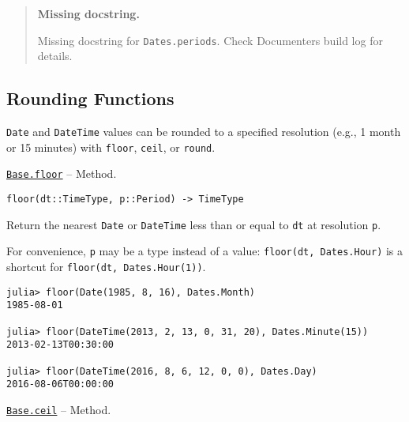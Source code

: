 \begin{quote}
\textbf{Missing docstring.}

Missing docstring for \texttt{Dates.periods}. Check Documenter{\textquotesingle}s build log for details.

\end{quote}


\hypertarget{17803150666173094488}{}


\subsection{Rounding Functions}



\texttt{Date} and \texttt{DateTime} values can be rounded to a specified resolution (e.g., 1 month or 15 minutes) with \texttt{floor}, \texttt{ceil}, or \texttt{round}.


\hypertarget{17172555621485794656}{}
\hyperlink{17172555621485794656}{\texttt{Base.floor}}  -- {Method.}

\begin{adjustwidth}{2em}{0pt}


\begin{verbatim}
floor(dt::TimeType, p::Period) -> TimeType
\end{verbatim}

Return the nearest \texttt{Date} or \texttt{DateTime} less than or equal to \texttt{dt} at resolution \texttt{p}.

For convenience, \texttt{p} may be a type instead of a value: \texttt{floor(dt, Dates.Hour)} is a shortcut for \texttt{floor(dt, Dates.Hour(1))}.


\begin{verbatim}
julia> floor(Date(1985, 8, 16), Dates.Month)
1985-08-01

julia> floor(DateTime(2013, 2, 13, 0, 31, 20), Dates.Minute(15))
2013-02-13T00:30:00

julia> floor(DateTime(2016, 8, 6, 12, 0, 0), Dates.Day)
2016-08-06T00:00:00
\end{verbatim}



\end{adjustwidth}
\hypertarget{15738953439830641094}{}
\hyperlink{15738953439830641094}{\texttt{Base.ceil}}  -- {Method.}

